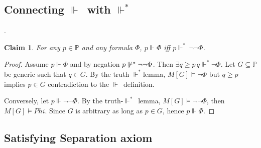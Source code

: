 \documentclass[11pt,pdftex,twoside,a4paper]{article}
\newcommand{\dsP}{\ensuremath{\mathds{P}}}
\newcommand{\forces}{\ensuremath{\Vdash}}
\newcommand{\forcesstar}{\ensuremath{\Vdash^*}}
\newtheorem{claim}[thm]{Claim}
\theoremstyle{definition}
\begin{document}
\subsection{Connecting \forces\ with \forcesstar}.

\begin{claim}
For any \(p\in\dsP\) and any formula \(\Phi\),
\(p\forces\Phi\) iff \(p\forcesstar\,\neg\neg\Phi\).
\end{claim}
\begin{proof}
Assume \(p\forces \Phi\) and by negation \(p\not\forcesstar\neg\neg \Phi\).
Then \(\exists q\geq p\, q \forcesstar \neg\Phi\).
Let \(G\subseteq\dsP\) be generic such that \(q\in G\).
By the truth-\forcesstar lemma, \(M[G]\models \neg\Phi\) but \(q\geq p\)
implies \(p\in G\) contradiction to the \forces\ definition.

Conversely, let \(p\forces \neg\neg \Phi\).
By the truth-\forcesstar\ lemma, \(M[G]\models \neg\neg\Phi\),
then \(M[G]\models Phi\).
Since $G$ is arbitrary as long as \(p\in G\), hence \(p\forces \Phi\).
\end{proof}

\subsection{Satisfying Separation axiom}
\end{document}
